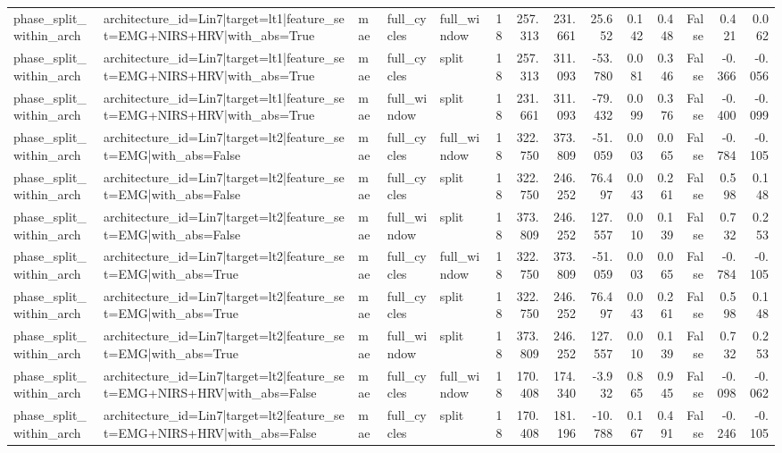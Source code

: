 \begin{table}
\begin{tabular}{lllllrrrrrrrrr}
phase_split_within_arch & architecture_id=Lin7|target=lt1|feature_set=EMG+NIRS+HRV|with_abs=True & mae & full_cycles & full_window & 18 & 257.313 & 231.661 & 25.652 & 0.142 & 0.448 & False & 0.421 & 0.062 \\
phase_split_within_arch & architecture_id=Lin7|target=lt1|feature_set=EMG+NIRS+HRV|with_abs=True & mae & full_cycles & split & 18 & 257.313 & 311.093 & -53.780 & 0.081 & 0.346 & False & -0.366 & -0.056 \\
phase_split_within_arch & architecture_id=Lin7|target=lt1|feature_set=EMG+NIRS+HRV|with_abs=True & mae & full_window & split & 18 & 231.661 & 311.093 & -79.432 & 0.099 & 0.376 & False & -0.400 & -0.099 \\
phase_split_within_arch & architecture_id=Lin7|target=lt2|feature_set=EMG|with_abs=False & mae & full_cycles & full_window & 18 & 322.750 & 373.809 & -51.059 & 0.003 & 0.065 & False & -0.784 & -0.105 \\
phase_split_within_arch & architecture_id=Lin7|target=lt2|feature_set=EMG|with_abs=False & mae & full_cycles & split & 18 & 322.750 & 246.252 & 76.497 & 0.043 & 0.261 & False & 0.598 & 0.148 \\
phase_split_within_arch & architecture_id=Lin7|target=lt2|feature_set=EMG|with_abs=False & mae & full_window & split & 18 & 373.809 & 246.252 & 127.557 & 0.010 & 0.139 & False & 0.732 & 0.253 \\
phase_split_within_arch & architecture_id=Lin7|target=lt2|feature_set=EMG|with_abs=True & mae & full_cycles & full_window & 18 & 322.750 & 373.809 & -51.059 & 0.003 & 0.065 & False & -0.784 & -0.105 \\
phase_split_within_arch & architecture_id=Lin7|target=lt2|feature_set=EMG|with_abs=True & mae & full_cycles & split & 18 & 322.750 & 246.252 & 76.497 & 0.043 & 0.261 & False & 0.598 & 0.148 \\
phase_split_within_arch & architecture_id=Lin7|target=lt2|feature_set=EMG|with_abs=True & mae & full_window & split & 18 & 373.809 & 246.252 & 127.557 & 0.010 & 0.139 & False & 0.732 & 0.253 \\
phase_split_within_arch & architecture_id=Lin7|target=lt2|feature_set=EMG+NIRS+HRV|with_abs=False & mae & full_cycles & full_window & 18 & 170.408 & 174.340 & -3.932 & 0.865 & 0.945 & False & -0.098 & -0.062 \\
phase_split_within_arch & architecture_id=Lin7|target=lt2|feature_set=EMG+NIRS+HRV|with_abs=False & mae & full_cycles & split & 18 & 170.408 & 181.196 & -10.788 & 0.167 & 0.491 & False & -0.246 & -0.105 \\

\end{tabular}
\end{table}
